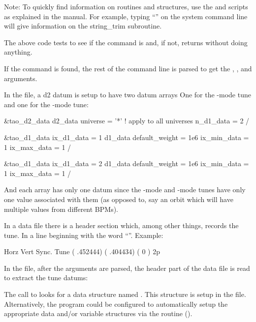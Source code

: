 {{{{Note: To quickly find information on routines and structures, use the  and 
scripts as explained in the \bmad manual. For example, typing ``'' 
on the system command line will give information on the string_trim subroutine.

The above code tests to see if the command is  and, if not, returns without
doing anything.

If the  command is found, the rest of the command line is parsed to get the 
, , and  arguments.

In the  file, a  d2 datum is setup to have two  datum arrays
One for the -mode tune and one for the -mode tune:
\begin{example}
  \&tao_d2_data
    d2_data%
    universe = '*'  ! apply to all universes
    n_d1_data = 2
  /

  \&tao_d1_data
    ix_d1_data = 1
    d1_data%
    default_weight = 1e6
    ix_min_data = 1
    ix_max_data = 1
  /

  \&tao_d1_data
    ix_d1_data = 2
    d1_data%
    default_weight = 1e6
    ix_min_data = 1
    ix_max_data = 1
  /
\end{example}
And each  array has only one datum since the -mode and -mode tunes have
only one value associated with them (as opposed to, say an orbit which will have multiple
values from different BPMs).

In a data file there is a header section which, among other things, records the tune.
In a line beginning with the word ``''. Example:
\begin{example}
                   Horz         Vert         Sync.                           
   Tune           ( .452444)   ( .404434)   ( 0      ) 2p                    
\end{example}

In the  file, after the arguments are parsed, the header part of the
data file is read to extract the tune datums:
The call to  looks for a  data structure named . This
structure is setup in the  file. Alternatively, the  program
could be configured to automatically setup the appropriate data and/or variable structures
via the  routine (). 

}}}}
